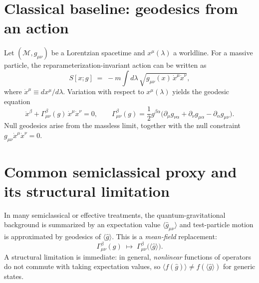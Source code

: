 \documentclass[11pt,a4paper]{article}
\theoremstyle{thmstyleone}
\theoremstyle{thmstyletwo}
\theoremstyle{thmstylethree}
\begin{document}
        \section{Classical baseline: geodesics from an action}
            Let $(\mathcal{M},g_{\mu\nu})$ be a Lorentzian spacetime and $x^\mu(\lambda)$ a worldline.
            For a massive particle, the reparameterization-invariant action can be written as
            \begin{equation}
                S[x;g] \;=\; -m \int d\lambda\, \sqrt{g_{\mu\nu}(x)\,\dot x^\mu \dot x^\nu},
            \end{equation}
            where $\dot x^\mu \equiv dx^\mu/d\lambda$.
            Variation with respect to $x^\mu(\lambda)$ yields the geodesic equation
            \begin{equation}
                \ddot x^\beta + \Gamma^\beta_{\mu\nu}(g)\,\dot x^\mu \dot x^\nu = 0,
                \qquad
                \Gamma^\beta_{\mu\nu}(g) = \frac{1}{2} g^{\beta\alpha}\big(\partial_\mu g_{\nu\alpha}
                +\partial_\nu g_{\mu\alpha}-\partial_\alpha g_{\mu\nu}\big).
                \label{eq:classical_geodesic}
            \end{equation}
            Null geodesics arise from the massless limit, together with the null constraint $g_{\mu\nu}\dot x^\mu\dot x^\nu=0$.

        \section{Common semiclassical proxy and its structural limitation}
            In many semiclassical or effective treatments, the quantum-gravitational background is summarized by an expectation value
            $\langle \hat g_{\mu\nu}\rangle$ and test-particle motion is approximated by geodesics of $\langle \hat g\rangle$.
            This is a \emph{mean-field} replacement:
            \begin{equation}
                \Gamma^\beta_{\mu\nu}(g) \;\mapsto\; \Gamma^\beta_{\mu\nu}\big(\langle \hat g\rangle\big).
            \end{equation}
            A structural limitation is immediate: in general, \emph{nonlinear} functions of operators do not commute with taking expectation values,
            so $\langle f(\hat g)\rangle \neq f(\langle \hat g\rangle)$ for generic states.
\end{document}
